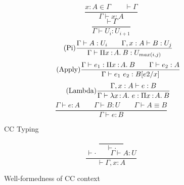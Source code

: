 \begin{figure}
	\begin{equation}
		\tag{Var}
		\frac
			{x : A \in \Gamma \qquad \vdash \Gamma}
			{\Gamma \vdash x : A}
	\end{equation} \hspace{0.5cm}
	\begin{equation}
		\tag{Universe}
		\frac
			{\vdash \Gamma}
			{\Gamma \vdash U_i : U_{i+1}}
	\end{equation} \hspace{0.5cm}
	\begin{equation}
		\tag{Pi}
		\frac
			{\Gamma \vdash A : U_i \qquad \Gamma, x : A \vdash B : U_j
			}
			{\Gamma \vdash \Pi x\mkern1.5mu{\hspace{0.5mm}{:}\hspace{0.5mm}} A.\hspace{0.8mm}B : U_{max(i, j)}}
	\end{equation} \hspace{0.5cm}
	\begin{equation}
		\tag{Apply}
		\frac
			{\Gamma \vdash e_1 : \Pi x\mkern1.5mu{\hspace{0.5mm}{:}\hspace{0.5mm}} A.\hspace{0.8mm}B \qquad \Gamma \vdash e_2 : A}
			{\Gamma \vdash e_1 \ e_2 : B[e2\slash x]}
	\end{equation} \hspace{0.5cm}
	\begin{equation}
		\tag{Lambda}
		\frac
			{ \Gamma, x : A \vdash e : B}
			{ \Gamma \vdash \lambda x\hspace{0.5mm}{:}\hspace{0.5mm} A.\ e : \Pi x\mkern1.5mu{\hspace{0.5mm}{:}\hspace{0.5mm}} A.\hspace{0.8mm}B}
	\end{equation} \hspace{0.5cm}
	\begin{equation}
		\tag{Equiv}
		\frac
			{\Gamma \vdash e : A \qquad \Gamma \vdash B : U \qquad \Gamma \vdash A \equiv B}
			{\Gamma \vdash e : B}
	\end{equation}
	\caption{CC Typing}
	\label{fig:cc typing}
\end{figure}

\begin{figure}
	\begin{equation}
		\tag{WF-Empty}
		\frac{ }{\quad \vdash {\cdot} \quad}
	\end{equation} \hspace{0.5cm}
	\begin{equation}
		\tag{WF-Con}
		\frac
			{\vdash \cdot \qquad \Gamma \vdash A : U}
			{\vdash \Gamma , x : A}
	\end{equation}
	\caption{Well-formedness of CC context}
    \label{fig:cc context}
\end{figure}

